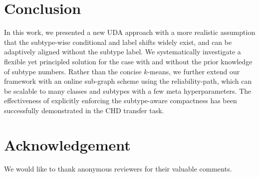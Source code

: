 


\section{Conclusion}\label{sec:conc}

In this work, we presented a new UDA approach with a more realistic assumption that the subtype-wise conditional and label shifts widely exist, and can be adaptively aligned without the subtype label. We systematically investigate a flexible yet principled solution for the case with and without the prior knowledge of subtype numbers. Rather than the concise $k$-means, we further extend our framework with an online sub-graph scheme using the reliability-path, which can be scalable to many classes and subtypes with a few meta hyperparameters. The effectiveness of explicitly enforcing the subtype-aware compactness has been successfully demonstrated in the CHD transfer task.   



\section{Acknowledgement}

We would like to thank anonymous reviewers for their valuable comments.

